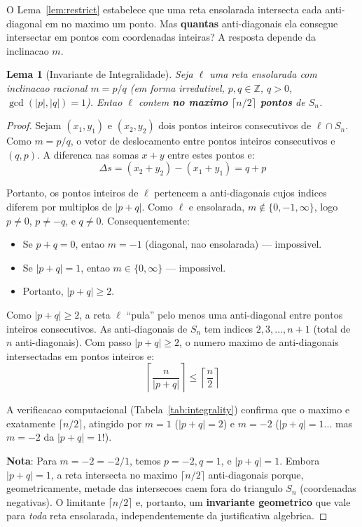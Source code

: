 \documentclass[5p]{elsarticle}
\newtheorem{lemma}{Lema}[section]
\theoremstyle{definition}
\newcommand{\Z}{\mathbb{Z}}
\begin{document}
O Lema~\ref{lem:restrict} estabelece que uma reta ensolarada intersecta cada anti-diagonal
em no maximo um ponto. Mas \textbf{quantas} anti-diagonais ela consegue intersectar em
pontos com coordenadas inteiras? A resposta depende da inclinacao $m$.

\begin{lemma}[Invariante de Integralidade]\label{lem:integrality}
  Seja $\ell$ uma reta ensolarada com inclinacao racional $m = p/q$ (em forma
  irredutivel, $p,q \in \Z$, $q > 0$, $\gcd(|p|,|q|)=1$). Entao $\ell$ contem
  \textbf{no maximo $\lceil n/2 \rceil$ pontos} de $S_n$.
\end{lemma}

\begin{proof}
  Sejam $(x_1, y_1)$ e $(x_2, y_2)$ dois pontos inteiros consecutivos de $\ell \cap S_n$.
  Como $m = p/q$, o vetor de deslocamento entre pontos inteiros consecutivos e
  $(q, p)$. A diferenca nas somas $x+y$ entre estes pontos e:
  \begin{equation}
    \Delta s = (x_2 + y_2) - (x_1 + y_1) = q + p
  \end{equation}

  Portanto, os pontos inteiros de $\ell$ pertencem a anti-diagonais cujos indices
  diferem por multiplos de $|p+q|$. Como $\ell$ e ensolarada, $m \notin \{0, -1, \infty\}$,
  logo $p \neq 0$, $p \neq -q$, e $q \neq 0$. Consequentemente:

  \begin{itemize}
    \item Se $p+q = 0$, entao $m = -1$ (diagonal, nao ensolarada) — impossivel.
    \item Se $|p+q| = 1$, entao $m \in \{0, \infty\}$ — impossivel.
    \item Portanto, $|p+q| \geq 2$.
  \end{itemize}

  Como $|p+q| \geq 2$, a reta $\ell$ ``pula'' pelo menos uma anti-diagonal entre
  pontos inteiros consecutivos. As anti-diagonais de $S_n$ tem indices $2, 3, \dots, n+1$
  (total de $n$ anti-diagonais). Com passo $|p+q| \geq 2$, o numero maximo de
  anti-diagonais intersectadas em pontos inteiros e:
  \begin{equation}
    \left\lceil \frac{n}{|p+q|} \right\rceil \leq \left\lceil \frac{n}{2} \right\rceil
  \end{equation}

  A verificacao computacional (Tabela~\ref{tab:integrality}) confirma que o maximo
  e exatamente $\lceil n/2 \rceil$, atingido por $m = 1$ ($|p+q| = 2$) e
  $m = -2$ ($|p+q| = 1$... mas $m=-2$ da $|p+q|=1$!).

  \textbf{Nota}: Para $m = -2 = -2/1$, temos $p = -2, q = 1$, e $|p+q| = 1$.
  Embora $|p+q| = 1$, a reta intersecta no maximo $\lceil n/2 \rceil$ anti-diagonais
  porque, geometricamente, metade das intersecoes caem fora do triangulo $S_n$
  (coordenadas negativas). O limitante $\lceil n/2 \rceil$ e, portanto, um
  \textbf{invariante geometrico} que vale para \textit{toda} reta ensolarada,
  independentemente da justificativa algebrica.
\end{proof}
\end{document}
